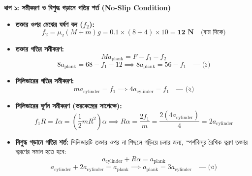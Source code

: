 \documentclass[12pt, a4paper]{article}
\begin{document}
\begin{tcolorbox}[solutionbox={সমাধান (Solution)}]
\noindent
\textbf{ধাপ ১: সমীকরণ ও বিশুদ্ধ গড়ানে গতির শর্ত (No-Slip Condition)} \\
\begin{itemize}[leftmargin=*, parsep=0.4ex]
    \item \textbf{তক্তার ওপর মেঝের ঘর্ষণ বল ($f_2$):} 
    $$f_2 = \mu_2 (M+m)g = 0.1 \times (8+4) \times 10 = \mathbf{12\text{ N}} \quad \text{(বাম দিকে)}$$
    \item \textbf{তক্তার গতির সমীকরণ:} 
    $$M a_{\text{plank}} = F - f_1 - f_2$$
    $$8 a_{\text{plank}} = 68 - f_1 - 12 \implies 8 a_{\text{plank}} = 56 - f_1 \quad \text{--- (১)}$$
    \item \textbf{সিলিন্ডারের গতির সমীকরণ:} 
    $$m a_{\text{cylinder}} = f_1 \implies 4 a_{\text{cylinder}} = f_1 \quad \text{--- (২)}$$
    \item \textbf{সিলিন্ডারের ঘূর্ণন সমীকরণ (ভরকেন্দ্রের সাপেক্ষে):} 
    $$f_1 R = I \alpha = \left(\frac{1}{2} m R^2\right) \alpha \implies R \alpha = \frac{2 f_1}{m} = \frac{2(4 a_{\text{cylinder}})}{4} = 2 a_{\text{cylinder}}$$
    \item \textbf{বিশুদ্ধ গড়ানে গতির শর্ত:} সিলিন্ডারটি তক্তার ওপর না পিছলে গড়িয়ে চলার জন্য, স্পর্শবিন্দুর রৈখিক ত্বরণ তক্তার ত্বরণের সমান হতে হবে:
    $$a_{\text{cylinder}} + R \alpha = a_{\text{plank}}$$ 
    $$a_{\text{cylinder}} + 2 a_{\text{cylinder}} = a_{\text{plank}} \implies a_{\text{plank}} = 3 a_{\text{cylinder}} \quad \text{--- (৩)}$$
\end{itemize}

\vspace{1em}
\begin{center}
\end{center}
\end{tcolorbox}
\end{document}
